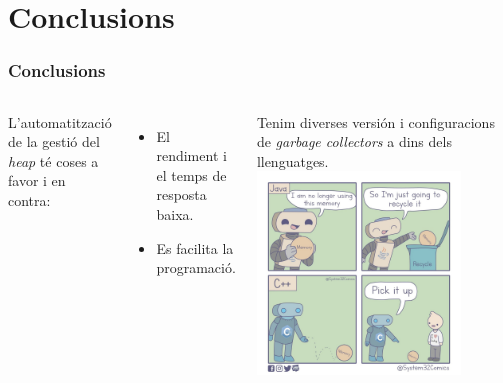 \documentclass{beamer}
\newcommand{\newSectionFrame}[1]{\section{#1} \begin{frame}\frametitle{#1}}
\begin{document}
    \newSectionFrame{Conclusions}
        \begin{columns}
            L'automatització de la gestió del \textit{heap} té coses a favor i en contra:
                \begin{itemize}
                    \item El rendiment i el temps de resposta baixa. 
                    \item Es facilita la programació.
                \end{itemize}
            Tenim diverses versión i configuracions de \textit{garbage collectors} a dins dels llenguatges.
                \includegraphics[width=0.8\textwidth]{Meme2.jpeg}
        \end{columns}
    \end{frame}

    \frame{\titlepage}
\end{document}

